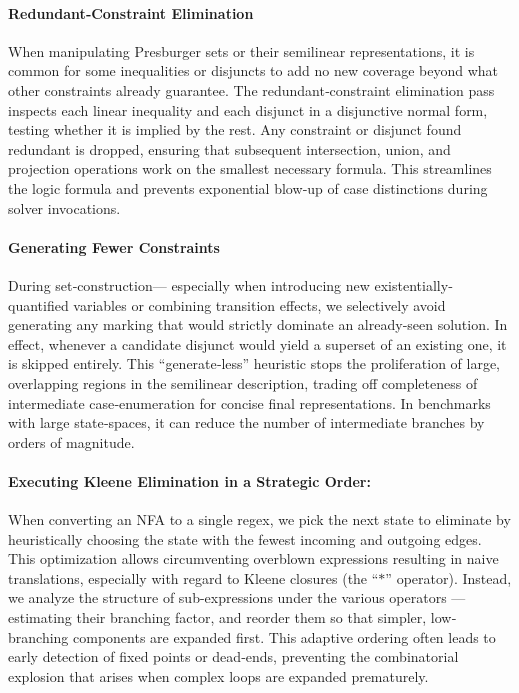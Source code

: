 \paragraph{Redundant‐Constraint Elimination}
When manipulating Presburger sets or their semilinear representations, it is common for some inequalities or disjuncts to add no new coverage beyond what other constraints already guarantee.  The redundant‐constraint elimination pass inspects each linear inequality and each disjunct in a disjunctive normal form, testing whether it is implied by the rest.  Any constraint or disjunct found redundant is dropped, ensuring that subsequent intersection, union, and projection operations work on the smallest necessary formula.  This streamlines the logic formula and prevents exponential blow‐up of case distinctions during solver invocations.
%

\paragraph{Generating Fewer Constraints}
During set‐construction--- especially when introducing new existentially‐quantified variables or combining transition effects, we selectively avoid generating any marking that would strictly dominate an already‐seen solution.  In effect, whenever a candidate disjunct would yield a superset of an existing one, it is skipped entirely.  This ``generate‐less” heuristic stops the proliferation of large, overlapping regions in the semilinear description, trading off completeness of intermediate case‐enumeration for concise final representations.  In benchmarks with large state‐spaces, it can reduce the number of intermediate branches by orders of magnitude.


\paragraph{Executing Kleene Elimination in a Strategic Order:}
When converting an NFA to a single regex, we pick the next state to eliminate by heuristically choosing the  state with the fewest incoming and outgoing edges.
This optimization allows circumventing 
overblown expressions resulting in naive translations, especially with regard to  Kleene closures (the “\(\mathsf{*}\)” operator).  Instead, we analyze the structure of sub-expressions under the various operators --- estimating their branching factor, and reorder them so that simpler, low‐branching components are expanded first.  This adaptive ordering often leads to early detection of fixed points or dead‐ends, preventing the combinatorial explosion that arises when complex loops are expanded prematurely.  




